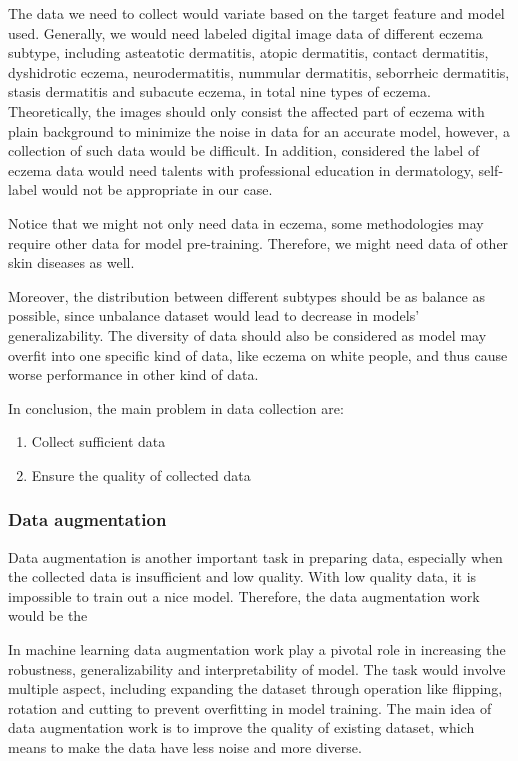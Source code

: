                 The data we need to collect would variate based on the target feature and model used. Generally, we would need labeled digital image data of different eczema subtype, including asteatotic dermatitis, atopic dermatitis, contact dermatitis, dyshidrotic eczema, neurodermatitis, nummular dermatitis, seborrheic dermatitis, stasis dermatitis and subacute eczema, in total nine types of eczema. Theoretically, the images should only consist the affected part of eczema with plain background to minimize the noise in data for an accurate model, however, a collection of such data would be difficult. In addition, considered the label of eczema data would need talents with professional education in dermatology, self-label would not be appropriate in our case.

                Notice that we might not only need data in eczema, some methodologies may require other data for model pre-training. Therefore, we might need data of other skin diseases as well.

                Moreover, the distribution between different subtypes should be as balance as possible, since unbalance dataset would lead to decrease in models' generalizability. The diversity of data should also be considered as model may overfit into one specific kind of data, like eczema on white people, and thus cause worse performance in other kind of data.

                In conclusion, the main problem in data collection are:
                \begin{enumerate}
                    \item Collect sufficient data
                    \item Ensure the quality of collected data
                \end{enumerate}

            \subsubsection{Data augmentation}

                Data augmentation is another important task in preparing data, especially when the collected data is insufficient and low quality. With low quality data, it is impossible to train out a nice model. Therefore, the data augmentation work would be the 

                In machine learning data augmentation work play a pivotal role in increasing the robustness, generalizability and interpretability of model. The task would involve multiple aspect, including expanding the dataset through operation like flipping, rotation and cutting to prevent overfitting in model training. The main idea of data augmentation work is to improve the quality of existing dataset, which means to make the data have less noise and more diverse.
                
